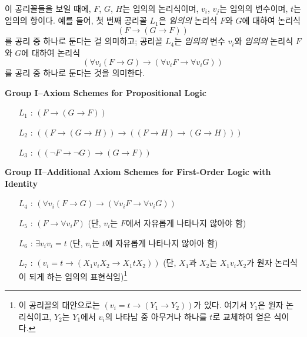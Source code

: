 \documentclass[12pt]{paper}
\begin{document}
  이 공리꼴들을 보일 때에,
  $F$, $G$, $H$는 임의의 논리식이며,
  $v_i$, $v_j$는 임의의 변수이며,
  $t$는 임의의 항이다.
  예를 들어, 첫 번째 공리꼴 $L_1$은 \textit{임의의} 논리식 $F$와 $G$에 대하여 논리식 $$\left( F \rightarrow \left( G \rightarrow F \right) \right)$$를 공리 중 하나로 둔다는 걸 의미하고;
  공리꼴 $L_4$는 \textit{임의의} 변수 $v_i$와 \textit{임의의} 논리식 $F$와 $G$에 대하여 논리식 $$\left( \forall v_i \left( F \rightarrow G \right) \rightarrow \left( \forall v_i F \rightarrow \forall v_i G \right) \right)$$를 공리 중 하나로 둔다는 것을 의미한다.

  \noindent \textbf{Group I--Axiom Schemes for Propositional Logic}
  \begin{enumerate}
    \item[$L_{1}$ :] $\left( F \rightarrow \left( G \rightarrow F \right) \right)$
    \item[$L_{2}$ :] $\left( \left( F \rightarrow \left( G \rightarrow H \right) \right) \rightarrow \left( \left( F \rightarrow H \right) \rightarrow \left( G \rightarrow H \right) \right) \right)$
    \item[$L_{3}$ :] $\left( \left( \lnot F \rightarrow \lnot G \right) \rightarrow \left( G \rightarrow F \right) \right)$
  \end{enumerate}

  \noindent \textbf{Group II--Additional Axiom Schemes for First-Order Logic with Identity}
  \begin{enumerate}
    \item[$L_{4}$ :] $\left( \forall v_i \left( F \rightarrow G \right) \rightarrow \left( \forall v_i F \rightarrow \forall v_i G \right) \right)$
    \item[$L_{5}$ :] $\left( F \rightarrow \forall v_i F \right)$ (단, $v_i$는 $F$에서 자유롭게 나타나지 않아야 함)
    \item[$L_{6}$ :] $\exists v_i v_i = t$ (단, $v_i$는 $t$에 자유롭게 나타나지 않아아 함)
    \item[$L_{7}$ :] $\left( v_i = t \rightarrow \left( X_1 v_i X_2 \rightarrow X_1 t X_2 \right) \right)$ (단, $X_1$과 $X_2$는 $X_1 v_i X_2$가 원자 논리식이 되게 하는 임의의 표현식임)\footnote
    {
      이 공리꼴의 대안으로는 $\left( v_i = t \rightarrow \left( Y_1 \rightarrow Y_2 \right) \right)$가 있다.
      여기서 $Y_1$은 원자 논리식이고, $Y_2$는 $Y_1$에서 $v_i$의 나타남 중 아무거나 하나를 $t$로 교체하여 얻은 식이다.
    }
  \end{enumerate}
\end{document}
